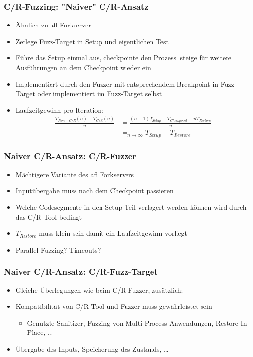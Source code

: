 \documentclass[handout]{beamer}
\begin{document}
\begin{frame}
    \frametitle{C/R-Fuzzing: "Naiver" C/R-Ansatz}
    \begin{itemize}
        \item Ähnlich zu afl Forkserver
        \item Zerlege Fuzz-Target in Setup und eigentlichen Test
        \item Führe das Setup einmal aus, checkpointe den Prozess, steige für weitere Ausführungen an dem Checkpoint wieder ein
        \item Implementiert durch den Fuzzer mit entsprechendem Breakpoint in Fuzz-Target oder implementiert im Fuzz-Target selbst
        \item Laufzeitgewinn pro Iteration:
            \begin{equation}
                \begin{split}
                    \frac{T_{Non-C/R}(n) - T_{C/R}(n)}{n} &= \frac{(n-1) T_{Setup} - T_{Checkpoint} - n T_{Restore}}{n} \\
                    &=_{n \to \infty} T_{Setup} - T_{Restore}
                \end{split}
            \end{equation}
    \end{itemize}
\end{frame}


\begin{frame}
    \frametitle{Naiver C/R-Ansatz: C/R-Fuzzer}
    \begin{itemize}
        \item Mächtigere Variante des afl Forkservers
        \item Inputübergabe muss nach dem Checkpoint passieren
        \item Welche Codesegmente in den Setup-Teil verlagert werden können wird durch das C/R-Tool bedingt
        \item $T_{Restore}$ muss klein sein damit ein Laufzeitgewinn vorliegt
        \item Parallel Fuzzing? Timeouts?
    \end{itemize}
\end{frame}

\begin{frame}
    \frametitle{Naiver C/R-Ansatz: C/R-Fuzz-Target}
    \begin{itemize}
        \item Gleiche Überlegungen wie beim C/R-Fuzzer, zusätzlich:
        \item Kompatibilität von C/R-Tool und Fuzzer muss gewährleistet sein
            \begin{itemize}
                \item Genutzte Sanitizer, Fuzzing von Multi-Process-Anwendungen, Restore-In-Place, \dots
            \end{itemize}
        \item Übergabe des Inputs, Speicherung des Zustands, \dots
    \end{itemize}
\end{frame}
\end{document}
